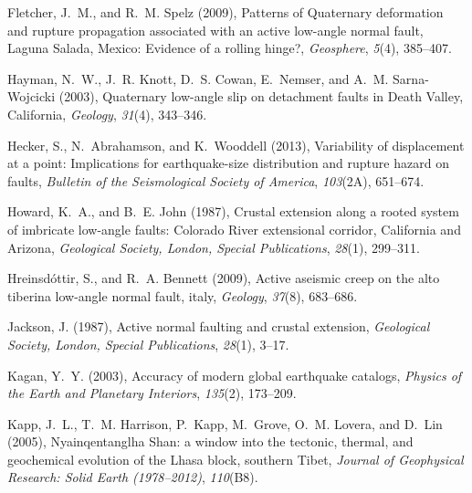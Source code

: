 \documentclass[twocolumn,grl]{AGUTeX}
\begin{document}
\begin{article}
\begin{thebibliography}{30}
Fletcher, J.~M., and R.~M. Spelz (2009), Patterns of {Q}uaternary deformation
  and rupture propagation associated with an active low-angle normal fault,
  {L}aguna {S}alada, {M}exico: Evidence of a rolling hinge?,
  \textit{Geosphere}, \textit{5}(4), 385--407.

Hayman, N.~W., J.~R. Knott, D.~S. Cowan, E.~Nemser, and A.~M. Sarna-Wojcicki
  (2003), Quaternary low-angle slip on detachment faults in {D}eath {V}alley,
  {C}alifornia, \textit{Geology}, \textit{31}(4), 343--346.

Hecker, S., N.~Abrahamson, and K.~Wooddell (2013), Variability of displacement
  at a point: Implications for earthquake-size distribution and rupture hazard
  on faults, \textit{Bulletin of the Seismological Society of America},
  \textit{103}(2A), 651--674.

Howard, K.~A., and B.~E. John (1987), Crustal extension along a rooted system
  of imbricate low-angle faults: {Colorado River} extensional corridor,
  {California} and {Arizona}, \textit{Geological Society, London, Special
  Publications}, \textit{28}(1), 299--311.

Hreinsd{\'o}ttir, S., and R.~A. Bennett (2009), Active aseismic creep on the
  alto tiberina low-angle normal fault, italy, \textit{Geology},
  \textit{37}(8), 683--686.

Jackson, J. (1987), Active normal faulting and crustal extension,
  \textit{Geological Society, London, Special Publications}, \textit{28}(1),
  3--17.

Kagan, Y.~Y. (2003), Accuracy of modern global earthquake catalogs,
  \textit{Physics of the Earth and Planetary Interiors}, \textit{135}(2),
  173--209.

Kapp, J.~L., T.~M. Harrison, P.~Kapp, M.~Grove, O.~M. Lovera, and D.~Lin
  (2005), Nyainqentanglha {S}han: a window into the tectonic, thermal, and
  geochemical evolution of the {L}hasa block, southern {T}ibet, \textit{Journal
  of Geophysical Research: Solid Earth (1978--2012)}, \textit{110}(B8).


\end{thebibliography}
\end{article}
\end{document}
